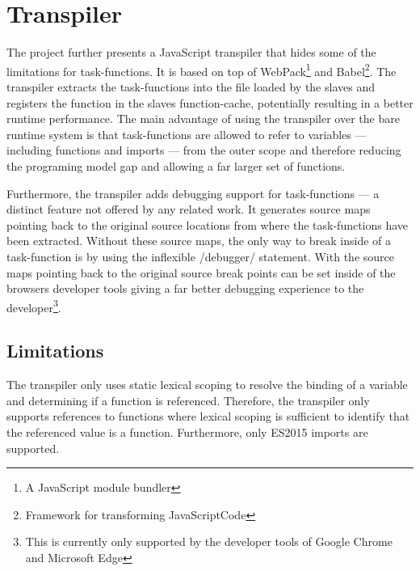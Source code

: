 \section{Transpiler}\label{sec:transpiler}
The project further presents a JavaScript transpiler that hides some of the limitations for task-functions. It is based on top of WebPack\footnote{A JavaScript module bundler} and Babel\footnote{Framework for transforming JavaScriptCode}. The transpiler extracts the task-functions into the file loaded by the slaves and registers the function in the slaves function-cache, potentially resulting in a better runtime performance. The main advantage of using the transpiler over the bare runtime system is that task-functions are allowed to refer to variables --- including functions and imports --- from the outer scope and therefore reducing the programing model gap and allowing a far larger set of functions.


Furthermore, the transpiler adds debugging support for task-functions --- a distinct feature not offered by any related work. It generates source maps pointing back to the original source locations from where the task-functions have been extracted. Without these source maps, the only way to break inside of a task-function is by using the inflexible \javascriptinline/debugger/ statement. With the source maps pointing back to the original source break points can be set inside of the browsers developer tools giving a far better debugging experience to the developer\footnote{This is currently only supported by the developer tools of Google Chrome and Microsoft Edge}.

\subsection{Limitations}
The transpiler only uses static lexical scoping to resolve the binding of a variable and determining if a function is referenced. Therefore, the transpiler only supports references to functions where lexical scoping is sufficient to identify that the referenced value is a function. Furthermore, only ES2015 imports are supported. 
